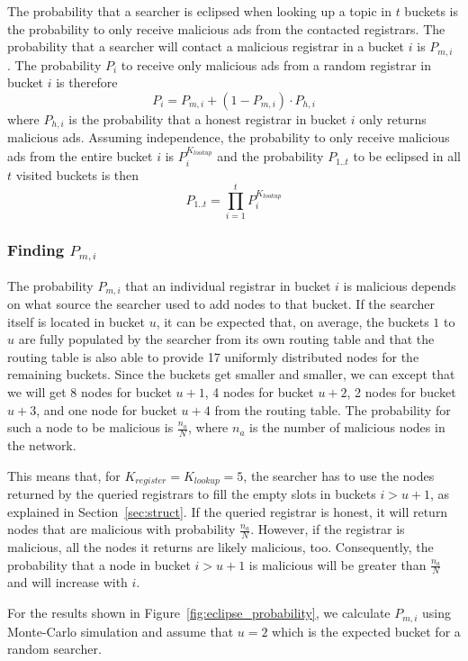 The probability that a searcher is eclipsed when looking up a topic in $t$ buckets is the probability to only receive malicious ads from the contacted registrars. The probability that a searcher will contact a malicious registrar in a bucket $i$ is $P_{m,i}$ .
The probability $P_i$ to receive only malicious ads from a random registrar in bucket $i$ is therefore
$$ P_{i} = P_{m,i} + (1-P_{m,i}) \cdot P_{h,i}$$
where $P_{h,i}$ is the probability that a honest registrar in bucket $i$ only returns malicious ads.
Assuming independence, the probability to only receive malicious ads from the entire bucket $i$ is $P_{i}^{K_\textit{lookup}}$ and the probability $P_{1..t}$ to be eclipsed in all $t$ visited buckets is then
$$ P_{1..t} = \prod_{i=1}^{t} P_{i}^{K_\textit{lookup}}$$

\subsubsection{Finding $P_{m,i}$}

The probability $P_{m,i}$ that an individual registrar in bucket $i$ is malicious depends on what source the searcher used to add nodes to that bucket.
If the searcher itself is located in bucket $u$, it can be expected that, on average, the buckets $1$ to $u$ are fully populated by the searcher from its own routing table and that the routing table is also able to provide 17 uniformly distributed nodes for the remaining buckets. Since the buckets get smaller and smaller, we can except that we will get 8 nodes for bucket $u+1$, 4 nodes for bucket $u+2$, 2 nodes for bucket $u+3$, and one node for bucket $u+4$ from the routing table.
The probability for such a node to be malicious is $\frac{n_a}{N}$, where $n_a$ is the number of malicious nodes in the network.

This means that, for $K_\textit{register}=K_\textit{lookup}=5$, the searcher has to use the nodes returned by the queried registrars to fill the empty slots in buckets $i>u+1$, as explained in Section~\ref{sec:struct}. If the queried registrar is honest, it will return nodes that are malicious with probability $\frac{n_a}{N}$. However, if the registrar is malicious, all the nodes it returns are likely malicious, too. Consequently, the probability that a node in bucket $i>u+1$ is malicious will be greater than $\frac{n_a}{N}$ and will increase with $i$.

For the results shown in Figure~\ref{fig:eclipse_probability}, we calculate $P_{m,i}$ using Monte-Carlo simulation and assume that $u=2$ which is the expected bucket for a random searcher.


